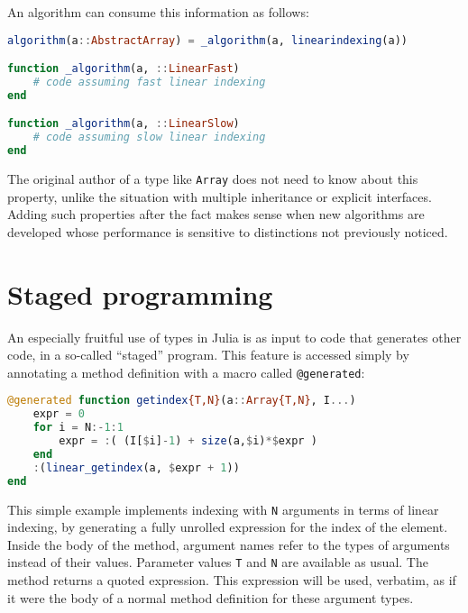 \noindent
An algorithm can consume this information as follows:

\begin{singlespace}
\begin{lstlisting}[language=julia]
algorithm(a::AbstractArray) = _algorithm(a, linearindexing(a))

function _algorithm(a, ::LinearFast)
    # code assuming fast linear indexing
end

function _algorithm(a, ::LinearSlow)
    # code assuming slow linear indexing
end
\end{lstlisting}
\end{singlespace}

\noindent
The original author of a type like \texttt{Array} does not need to know
about this property, unlike the situation with multiple inheritance or
explicit interfaces.
Adding such properties after the fact makes sense when new algorithms
are developed whose performance is sensitive to distinctions not
previously noticed.


\section{Staged programming}
\label{sec:stagedprogramming}

An especially fruitful use of types in Julia is as input to code that
generates other code, in a so-called ``staged'' program.
This feature is accessed simply by annotating a method definition
with a macro called \texttt{@generated}:

\begin{singlespace}
\begin{lstlisting}[language=julia]
@generated function getindex{T,N}(a::Array{T,N}, I...)
    expr = 0
    for i = N:-1:1
        expr = :( (I[$i]-1) + size(a,$i)*$expr )
    end
    :(linear_getindex(a, $expr + 1))
end
\end{lstlisting}
\end{singlespace}


\noindent
This simple example implements indexing with \texttt{N} arguments
in terms of linear indexing, by generating a fully unrolled expression
for the index of the element.
Inside the body of the method, argument names refer to the types of
arguments instead of their values.
Parameter values \texttt{T} and \texttt{N} are available as usual.
The method returns a quoted expression.
This expression will be used, verbatim, as if it were the body of
a normal method definition for these argument types.

